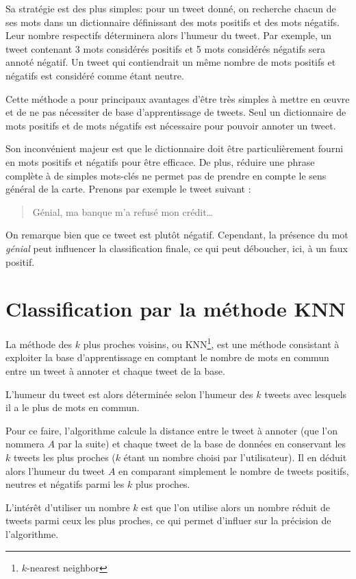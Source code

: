 \documentclass[12pt,a4paper]{report}
\begin{document}
Sa stratégie est des plus simples: pour un tweet donné, on recherche
chacun de ses mots dans un dictionnaire définissant des mots positifs et des
mots négatifs. Leur nombre respectifs déterminera alors l'humeur du tweet. Par
exemple, un tweet contenant 3 mots considérés positifs et 5 mots considérés
négatifs sera annoté négatif. Un tweet qui contiendrait un même nombre de mots
positifs et négatifs est considéré comme étant neutre.

Cette méthode a pour principaux avantages d'être très simples à mettre en œuvre
et de ne pas nécessiter de base d'apprentissage de tweets. Seul un dictionnaire
de mots positifs et de mots négatifs est nécessaire pour pouvoir annoter un
tweet.

Son inconvénient majeur est que le dictionnaire doit être particulièrement
fourni en mots positifs et négatifs pour être efficace. De plus, réduire une
phrase complète à de simples mots-clés ne permet pas de prendre en compte le
sens général de la carte. Prenons par exemple le tweet suivant :

\begin{quote}
    Génial, ma banque m'a refusé mon crédit…
\end{quote}

On remarque bien que ce tweet est plutôt négatif. Cependant, la présence du mot
\textit{génial} peut influencer la classification finale, ce qui peut déboucher,
ici, à un faux positif.

\section{Classification par la méthode KNN}
La méthode des $k$ plus proches voisins, ou KNN\footnote{$k$-nearest neighbor},
est une méthode consistant à exploiter la base d'apprentissage en comptant le
nombre de mots en commun entre un tweet à annoter et chaque tweet de la base.

L'humeur du tweet est alors déterminée selon l'humeur des $k$ tweets
avec lesquels il a le plus de mots en commun.

Pour ce faire, l'algorithme calcule la distance entre le tweet à annoter (que
l'on nommera $A$ par la suite) et chaque tweet de la base de données
en conservant les $k$ tweets les plus proches ($k$ étant un nombre
choisi par l'utilisateur). Il en déduit alors l'humeur du tweet $A$ en comparant
simplement le nombre de tweets positifs, neutres et négatifs parmi les $k$ plus
proches.

L'intérêt d'utiliser un nombre $k$ est que l'on utilise alors un nombre réduit
de tweets parmi ceux les plus proches, ce qui permet d'influer sur la précision
de l'algorithme.
\end{document}
